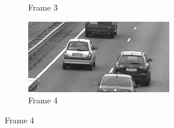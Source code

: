 \documentclass{article}
\begin{document}
\begin{enumerate}
\begin{figure}[h!]
\begin{subfigure}{0.24\textwidth}
        \caption{Frame 3}
    \end{subfigure}
    \begin{subfigure}{0.24\textwidth}
        \centering
        \includegraphics[width=\linewidth]{../images/cars/frame = 4.png}
        \caption{Frame 4}
    \end{subfigure}


\end{figure}
\end{enumerate}
\end{document}
